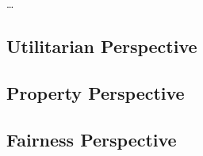 \ldots

\subsection{Utilitarian Perspective}
\label{sec:arguments_utilitarian}


\subsection{Property Perspective}
\label{sec:arguments_property}


\subsection{Fairness Perspective}
\label{sec:arguments_fairness}
